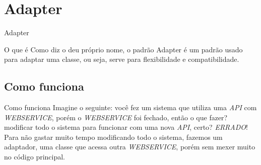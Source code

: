 \documentclass{if-beamer}
\begin{document}
\section{Adapter}
\begin{frame}{Adapter}
	\begin{block}{O que é}
		Como diz o deu próprio nome, o padrão Adapter é um padrão usado para adaptar uma classe, ou seja, serve para flexibilidade e compatibilidade.
	\end{block}

	\subsection{Como funciona}
	\begin{block}{Como funciona}
		Imagine o seguinte: você fez um sistema que utiliza uma {\itshape API} com {\itshape WEBSERVICE}, porém o {\itshape WEBSERVICE} foi fechado, então o que fazer? modificar todo o sistema para funcionar com uma nova {\itshape API}, certo? \emph{ERRADO}!
		\newline
		\newline
		Para não gastar muito tempo modificando todo o sistema, fazemos um adaptador, uma classe que acessa outra {\itshape WEBSERVICE}, porém sem mexer muito no código principal.
	\end{block}
\end{frame}
\end{document}
